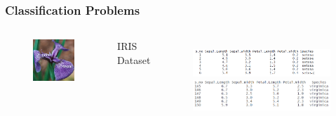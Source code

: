 \documentclass{beamer}
\begin{document}
\begin{frame}
	\frametitle{Classification Problems}
	\begin{columns}[c] %
		
		\begin{figure}
			\includegraphics[width=1\textwidth]{figs/iris-petal.jpg}
			
		\end{figure}
		
		IRIS Dataset
		\begin{figure}
			\includegraphics[width=1.0\textwidth]{figs/irisdata.png} \\
			\includegraphics[width=1.0\textwidth]{figs/irisdata2.png}
		\end{figure}			
	\end{columns}	
	

\end{frame}
\end{document}
